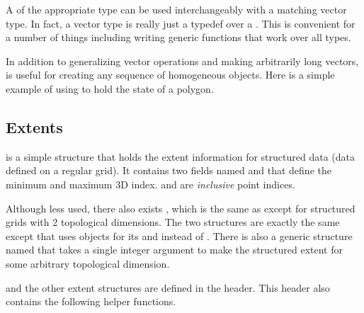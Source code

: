 A  of the appropriate type can be used interchangeably with a
matching vector type. In fact, a vector type is really just a typedef over
a . This is convenient for a number of things including writing
generic functions that work over all types.


In addition to generalizing vector operations and making arbitrarily long
vectors,  is useful for creating any sequence of homogeneous
objects. Here is a simple example of using  to hold the state of
a polygon.


\subsection{Extents}

 is a simple structure that holds the extent information for
structured data (data defined on a regular grid). It contains two
 fields named  and  that define the
minimum and maximum 3D index.  and  are
\emph{inclusive} point indices.

Although less used, there also exists , which is the same as
 except for structured grids with 2 topological
dimensions. The two structures are exactly the same except that
 uses  objects for its  and
 instead of . There is also a generic structure
named  that takes a single integer argument to make the
structured extent for some arbitrary topological dimension.

 and the other extent structures are defined in the
 header. This header also contains the following
helper functions.


